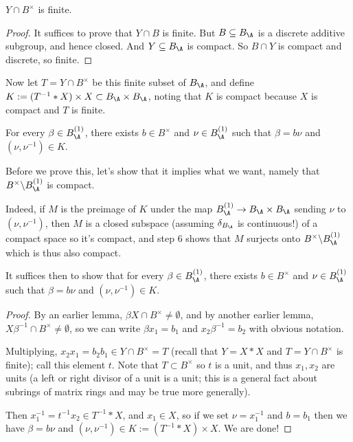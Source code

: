 \begin{lemma}
  \label{Y_meet_units_B}
  $Y\cap B^\times$ is finite.
\end{lemma}
\begin{proof} It suffices to prove that $Y\cap B$ is finite.
    But $B\subseteq B_{\A}$ is a discrete additive subgroup, and hence closed.
    And $Y\subseteq B_{\A}$ is compact.
    So $B\cap Y$ is compact and discrete, so finite.
\end{proof}

Now let $T=Y\cap B^\times$ be this finite subset
of $B_{\A}$, and define $K:= (T^{-1}*X) \times X\subset B_{\A}\times B_{\A}$,
noting that $K$ is compact because $X$ is compact and $T$ is finite.

\begin{lemma} For every $\beta\in B_{\A}^{(1)}$, there exists $b\in B^\times$
  and $\nu\in B_{\A}^{(1)}$ such that $\beta=b\nu$ and $(\nu,\nu^{-1})\in K.$
\end{lemma}

  Before we prove this, let's show that it implies what we want,
  namely that $B^\times\backslash B_{\A}^{(1)}$
  is compact.

  Indeed, if $M$ is the preimage of $K$ under the map $B_{\A}^{(1)} \to B_{\A}\times B_{\A}$
  sending $\nu$ to $(\nu,\nu^{-1})$, then $M$ is a closed subspace (assuming $\delta_{B_{\A}}$
  is continuous!) of a compact
  space so it's compact, and step 6 shows that $M$ surjects onto
  $B^\times\backslash B_{\A}^{(1)}$ which is thus also compact.


  It suffices then to show that for every $\beta\in B_{\A}^{(1)}$, there exists
  $b\in B^\times$ and $\nu\in B_{\A}^{(1)}$ such that $\beta=b\nu$ and
  $(\nu,\nu^{-1})\in K.$
\begin{proof}

  By an earlier lemma, $\beta X\cap B^\times\not=\emptyset$, and by another earlier lemma,
  $X\beta^{-1}\cap B^\times\not=\emptyset$, so we can write $\beta x_1=b_1$
  and $x_2\beta^{-1}=b_2$ with obvious notation.

  Multiplying, $x_2x_1=b_2b_1\in Y\cap B^\times=T$ (recall that $Y=X*X$ and $T=Y\cap B^\times$
  is finite); call this element $t$.
  Note that $T\subset B^\times$ so $t$ is a unit, and thus $x_1,x_2$ are units
  (a left or right divisor of a unit is a unit; this is a general fact about subrings of matrix
  rings and may be true more generally).

  Then $x_1^{-1}=t^{-1}x_2\in T^{-1}*X$, and $x_1\in X$, so if we set $\nu=x_1^{-1}$
  and $b=b_1$ then we have $\beta=b\nu$ and $(\nu,\nu^{-1})\in K := (T^{-1}*X)\times X$.
  We are done!
\end{proof}
